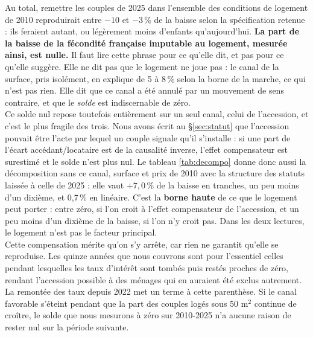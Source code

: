\documentclass[12pt,a4paper]{article}
\begin{document}
\noindent Au total, remettre les couples de 2025 dans l'ensemble des conditions de logement de 2010 reproduirait entre $-10$ et $-3$\,\% de la baisse selon la spécification retenue : ils feraient autant, ou légèrement moins d'enfants qu'aujourd'hui. \textbf{La part de la baisse de la fécondité française imputable au logement, mesurée ainsi, est nulle.} Il faut lire cette phrase pour ce qu'elle dit, et pas pour ce qu'elle suggère. Elle ne dit pas que le logement ne joue pas : le canal de la surface, pris isolément, en explique de 5 à 8\,\% selon la borne de la marche, ce qui n'est pas rien. Elle dit que ce canal a été annulé par un mouvement de sens contraire, et que le \textit{solde} est indiscernable de zéro. \\

\noindent Ce solde nul repose toutefois entièrement sur un seul canal, celui de l'accession, et c'est le plus fragile des trois. Nous avons écrit au §\ref{sec:statut} que l'accession pouvait être l'acte par lequel un couple signale qu'il s'installe : si une part de l'écart accédant/locataire est de la causalité inverse, l'effet compensateur est surestimé et le solde n'est plus nul. Le tableau \ref{tab:decompo} donne donc aussi la décomposition sans ce canal, surface et prix de 2010 avec la structure des statuts laissée à celle de 2025 : elle vaut $+7{,}0$\,\% de la baisse en tranches, un peu moins d'un dixième, et 0,7\,\% en linéaire. C'est la \textbf{borne haute} de ce que le logement peut porter : entre zéro, si l'on croit à l'effet compensateur de l'accession, et un peu moins d'un dixième de la baisse, si l'on n'y croit pas. Dans les deux lectures, le logement n'est pas le facteur principal. \\

\noindent Cette compensation mérite qu'on s'y arrête, car rien ne garantit qu'elle se reproduise. Les quinze années que nous couvrons sont pour l'essentiel celles pendant lesquelles les taux d'intérêt sont tombés puis restés proches de zéro, rendant l'accession possible à des ménages qui en auraient été exclus autrement. La remontée des taux depuis 2022 met un terme à cette parenthèse. Si le canal favorable s'éteint pendant que la part des couples logés sous 50 m$^2$ continue de croître, le solde que nous mesurons à zéro sur 2010-2025 n'a aucune raison de rester nul sur la période suivante. \\
\end{document}
